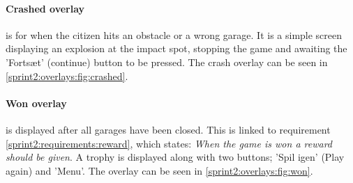 \paragraph{Crashed overlay} is for when the citizen hits an obstacle or a wrong garage.
It is a simple screen displaying an explosion at the impact spot, stopping the game and awaiting the 'Fortsæt' (continue) button to be pressed.
The crash overlay can be seen in \cref{sprint2:overlays:fig:crashed}.

\paragraph{Won overlay} is displayed after all garages have been closed.
This is linked to requirement \ref{sprint2:requirements:reward}, which states: \textit{When the game is won a reward should be given}.
A trophy is displayed along with two buttons; 'Spil igen' (Play again) and 'Menu'.
The overlay can be seen in \cref{sprint2:overlays:fig:won}.